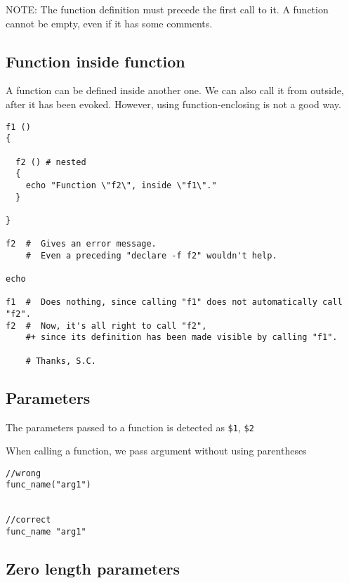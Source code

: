 NOTE: The function definition must precede the first call to it. A function
cannot be empty, even if it has some comments.

\subsection{Function inside function}

A function can be defined inside another one. We can also call it from outside,
after it has been evoked. However, using function-enclosing is not a good way.
\begin{verbatim}
f1 ()
{

  f2 () # nested
  {
    echo "Function \"f2\", inside \"f1\"."
  }

}  

f2  #  Gives an error message.
    #  Even a preceding "declare -f f2" wouldn't help.

echo    

f1  #  Does nothing, since calling "f1" does not automatically call "f2".
f2  #  Now, it's all right to call "f2",
    #+ since its definition has been made visible by calling "f1".

    # Thanks, S.C.
\end{verbatim}

\subsection{Parameters}

The parameters passed to a function is detected as \verb.$1., \verb.$2.

When calling a function, we pass argument without using parentheses
\begin{verbatim}
//wrong
func_name("arg1")


//correct
func_name "arg1"
\end{verbatim}

\subsection{Zero length parameters}

